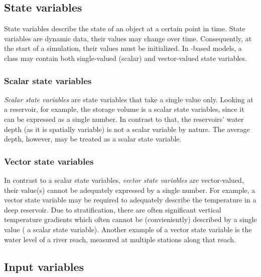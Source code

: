 \subsection{State variables} \label{sec:concept-classFeatures-states}

State variables describe the state of an object at a certain point in time. State variables are dynamic data, \ie{} their values may change over time. Consequently, at the start of a simulation, their values must be initialized. In -based models, a class may contain both single-valued (scalar) and vector-valued state variables.

\subsubsection*{Scalar state variables} \label{sec:concept-classFeatures-statesScal}

\emph{Scalar state variables} are state variables that take a single value only. Looking at a reservoir, for example, the storage volume is a scalar state variables, since it can be expressed as a single number. In contrast to that, the reservoirs' water depth (as it is spatially variable) is not a scalar variable by nature. The average depth, however, may be treated as a scalar state variable.

\subsubsection*{Vector state variables} \label{sec:concept-classFeatures-statesVect}

In contrast to a scalar state variables, \emph{vector state variables} are vector-valued, \ie{} their value(s) cannot be adequately expressed by a single number. For example, a vector state variable may be required to adequately describe the temperature in a deep reservoir. Due to stratification, there are often significant vertical temperature gradients which often cannot be (convieniently) described by a single value (\ie{} a scalar state variable). Another example of a vector state variable is the water level of a river reach, measured at multiple stations along that reach.

\subsection{Input variables} \label{sec:concept-classFeatures-inputs}


